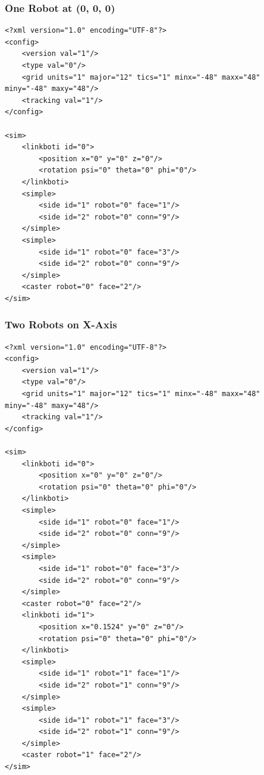 \documentclass{article}
\begin{document}
\subsubsection{One Robot at (0, 0, 0)}
\begin{verbatim}
<?xml version="1.0" encoding="UTF-8"?>
<config>
    <version val="1"/>
    <type val="0"/>
	<grid units="1" major="12" tics="1" minx="-48" maxx="48" miny="-48" maxy="48"/>
    <tracking val="1"/>
</config>

<sim>
    <linkboti id="0">
        <position x="0" y="0" z="0"/>
        <rotation psi="0" theta="0" phi="0"/>
    </linkboti>
    <simple>
        <side id="1" robot="0" face="1"/>
        <side id="2" robot="0" conn="9"/>
    </simple>
    <simple>
        <side id="1" robot="0" face="3"/>
        <side id="2" robot="0" conn="9"/>
    </simple>
    <caster robot="0" face="2"/>
</sim>
\end{verbatim}

\subsubsection{Two Robots on X-Axis}
\begin{verbatim}
<?xml version="1.0" encoding="UTF-8"?>
<config>
    <version val="1"/>
    <type val="0"/>
	<grid units="1" major="12" tics="1" minx="-48" maxx="48" miny="-48" maxy="48"/>
    <tracking val="1"/>
</config>

<sim>
    <linkboti id="0">
        <position x="0" y="0" z="0"/>
        <rotation psi="0" theta="0" phi="0"/>
    </linkboti>
    <simple>
        <side id="1" robot="0" face="1"/>
        <side id="2" robot="0" conn="9"/>
    </simple>
    <simple>
        <side id="1" robot="0" face="3"/>
        <side id="2" robot="0" conn="9"/>
    </simple>
    <caster robot="0" face="2"/>
    <linkboti id="1">
        <position x="0.1524" y="0" z="0"/>
        <rotation psi="0" theta="0" phi="0"/>
    </linkboti>
    <simple>
        <side id="1" robot="1" face="1"/>
        <side id="2" robot="1" conn="9"/>
    </simple>
    <simple>
        <side id="1" robot="1" face="3"/>
        <side id="2" robot="1" conn="9"/>
    </simple>
    <caster robot="1" face="2"/>
</sim>
\end{verbatim}
\end{document}
